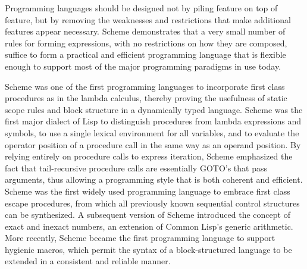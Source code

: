 
\label{historysection}

Programming languages should be designed not by piling feature on top of
feature, but by removing the weaknesses and restrictions that make additional
features appear necessary.  Scheme demonstrates that a very small number
of rules for forming expressions, with no restrictions on how they are
composed, suffice to form a practical and efficient programming language
that is flexible enough to support most of the major programming
paradigms in use today.

Scheme
was one of the first programming languages to incorporate first class
procedures as in the lambda calculus, thereby proving the usefulness of
static scope rules and block structure in a dynamically typed language.
Scheme was the first major dialect of Lisp to distinguish procedures
from lambda expressions and symbols, to use a single lexical
environment for all variables, and to evaluate the operator position
of a procedure call in the same way as an operand position.  By relying
entirely on procedure calls to express iteration, Scheme emphasized the
fact that tail-recursive procedure calls are essentially GOTO's that
pass arguments, thus allowing a programming style that is both coherent
and efficient.  Scheme was the first widely used programming language to
embrace first class escape procedures, from which all previously known
sequential control structures can be synthesized.  A subsequent
version of Scheme introduced the concept of exact and inexact numbers,
an extension of Common Lisp's generic arithmetic.
More recently, Scheme became the first programming language to support
hygienic macros, which permit the syntax of a block-structured language
to be extended in a consistent and reliable manner.

